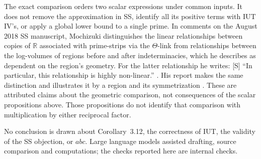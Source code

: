 \documentclass[11pt]{article}
\theoremstyle{remark}
\newcommand{\Smark}{\textup{[S]}}
\begin{document}
The exact comparison orders two scalar expressions under common inputs.
It does not remove the approximation in SS, identify all its positive
terms with IUT IV's, or apply a global lower bound to a single prime.
In comments on the August 2018 SS manuscript, Mochizuki distinguishes
the linear relationships between
copies of $\mathbb R$ associated with prime-strips via the $\Theta$-link
from relationships between the log-volumes of regions before and after
indeterminacies, which he describes as dependent on the region's geometry.
For the latter relationship he writes:
\Smark{} ``In particular, this relationship is highly non-linear.''
\cite[(C14), p.~4]{Cmt}.
His report makes the same distinction and illustrates it by a region and
its symmetrization \cite[\S12, (MlLV), (LVEx), pp.~24--26]{Rpt}.
These are attributed claims about the geometric comparison, not consequences
of the scalar propositions above.  Those propositions do not identify that
comparison with multiplication by either reciprocal factor.

No conclusion is drawn about Corollary~3.12, the correctness of IUT, the
validity of the SS objection, or $abc$.
Large language models assisted drafting, source comparison and computations;
the checks reported here are internal checks.
\end{document}
